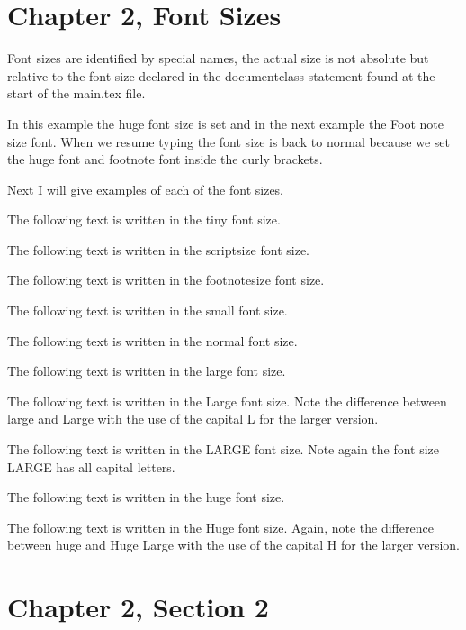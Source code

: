 


\section{Chapter 2, Font Sizes}

Font sizes are identified by special names, the actual size is not absolute but relative to the font size declared in the documentclass statement found at the start of the main.tex file. 


In this example the {\huge huge font size} is set and in the next example the {\footnotesize Foot note size font}. When we resume typing the font size is back to normal because we set the huge font and footnote font inside the curly brackets. 

Next I will give examples of each of the font sizes. 


The following text is written in the {\tiny tiny font size.} 

The following text is written in the {\scriptsize scriptsize font size.} 

The following text is written in the {\footnotesize footnotesize font size.} 

The following text is written in the {\small small font size.} 

The following text is written in the {\normalsize normal font size.} 

The following text is written in the {\large large font size.} 

The following text is written in the {\Large Large font size.} Note the difference between large and Large with the use of the capital L for the larger version. 

The following text is written in the {\LARGE LARGE font size.} Note again the font size LARGE has all capital letters.

The following text is written in the {\huge huge font size.} 

The following text is written in the {\Huge Huge font size.} Again, note the difference between huge and Huge Large with the use of the capital H for the larger version. 

\section{Chapter 2, Section 2}

